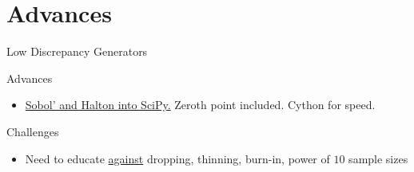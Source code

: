 \documentclass[11pt,compress,xcolor={usenames,dvipsnames},aspectratio=169]{beamer}
\begin{document}
\section{Advances}

\begin{frame}{Low Discrepancy Generators}
\begin{multicols}{2}
{\Large \alert{Advances}}
\begin{itemize}
	\item \href{https://github.com/scipy/scipy/pull/10844}{\alert{Sobol' and Halton into SciPy.}}  Zeroth point included.  Cython for speed.
\end{itemize}

\columnbreak
{\large \alert{Challenges}}
\begin{itemize}
	\item Need to educate \href{https://arxiv.org/pdf/2008.08051.pdf}{\alert{against}} dropping, thinning, burn-in, power of $10$ sample sizes \cite{Owe22a}
\end{itemize}

\end{multicols}
\end{frame}
	


\thankyouframe

\printbibliography
\end{document}
